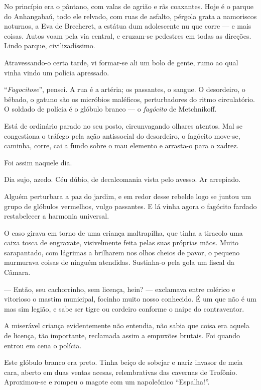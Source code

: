 No princípio era o pântano, com valas de agrião e rãs coaxantes. Hoje é
o parque do Anhangabaú, todo ele relvado, com ruas de asfalto, pérgola
grata a namoriscos noturnos, a Eva de Brecheret, a estátua dum
adolescente nu que corre --- e mais coisas. Autos voam pela via central,
e cruzam-se pedestres em todas as direções. Lindo parque,
civilizadíssimo.

Atravessando-o certa tarde, vi formar-se ali um bolo de gente, rumo ao
qual vinha vindo um polícia apressado.

``\emph{Fagocitose}'', pensei. A rua é a artéria; os passantes, o
sangue. O desordeiro, o bêbado, o gatuno são os micróbios maléficos,
perturbadores do ritmo circulatório. O soldado de polícia é o glóbulo
branco --- o \emph{fagócito} de Metchnikoff.

Está de ordinário parado no seu posto, circunvagando olhares atentos.
Mal se congestiona o tráfego pela ação antissocial do desordeiro, o
fagócito move-se, caminha, corre, cai a fundo sobre o mau elemento e
arrasta-o para o xadrez.

Foi assim naquele dia.

Dia sujo, azedo. Céu dúbio, de decalcomania vista pelo avesso. Ar
arrepiado.

Alguém perturbara a paz do jardim, e em redor desse rebelde logo se
juntou um grupo de glóbulos vermelhos, vulgo passantes. E lá vinha agora
o fagócito fardado restabelecer a harmonia universal.

O caso girava em torno de uma criança maltrapilha, que tinha a tiracolo
uma caixa tosca de engraxate, visivelmente feita pelas suas próprias
mãos. Muito sarapantado, com lágrimas a brilharem nos olhos cheios de
pavor, o pequeno murmurava coisas de ninguém atendidas. Sustinha-o pela
gola um fiscal da Câmara.

--- Então, seu cachorrinho, sem licença, hein? --- exclamava entre
colérico e vitorioso o mastim municipal, focinho muito nosso conhecido.
É um que não é um mas sim legião, e sabe ser tigre ou cordeiro conforme
o naipe do contraventor.

A miserável criança evidentemente não entendia, não sabia que coisa era
aquela de licença, tão importante, reclamada assim a empuxões brutais.
Foi quando entrou em cena o polícia.

Este glóbulo branco era preto. Tinha beiço de sobejar e nariz invasor de
meia cara, aberto em duas ventas acesas, relembrativas das cavernas de
Trofônio. Aproximou-se e rompeu o magote com um napoleônico
``Espalha!''.

